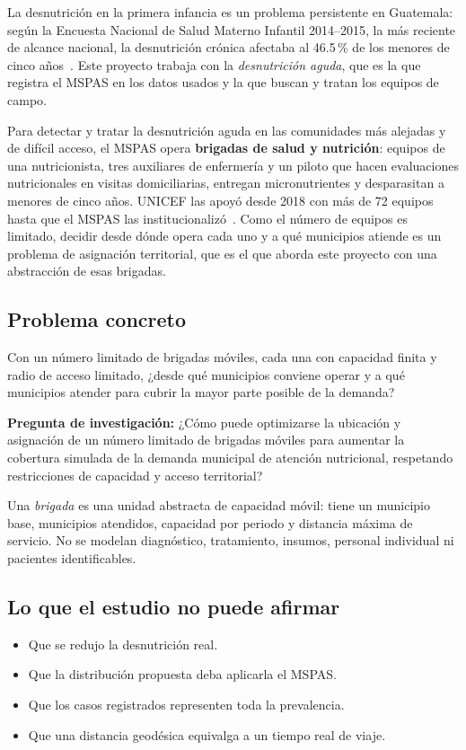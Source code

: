 \documentclass[11pt,letterpaper]{article}
\begin{document}
La desnutrición en la primera infancia es un problema persistente en Guatemala: según la Encuesta Nacional de Salud Materno Infantil 2014--2015, la más reciente de alcance nacional, la desnutrición crónica afectaba al 46.5\,\% de los menores de cinco años~\cite{ensmi}. Este proyecto trabaja con la \emph{desnutrición aguda}, que es la que registra el MSPAS en los datos usados y la que buscan y tratan los equipos de campo.

Para detectar y tratar la desnutrición aguda en las comunidades más alejadas y de difícil acceso, el MSPAS opera \textbf{brigadas de salud y nutrición}: equipos de una nutricionista, tres auxiliares de enfermería y un piloto que hacen evaluaciones nutricionales en visitas domiciliarias, entregan micronutrientes y desparasitan a menores de cinco años. UNICEF las apoyó desde 2018 con más de 72 equipos hasta que el MSPAS las institucionalizó~\cite{unicef2024}. Como el número de equipos es limitado, decidir desde dónde opera cada uno y a qué municipios atiende es un problema de asignación territorial, que es el que aborda este proyecto con una abstracción de esas brigadas.

\subsection{Problema concreto}

Con un número limitado de brigadas móviles, cada una con capacidad finita y radio de acceso limitado, ¿desde qué municipios conviene operar y a qué municipios atender para cubrir la mayor parte posible de la demanda?

\textbf{Pregunta de investigación:} ¿Cómo puede optimizarse la ubicación y asignación de un número limitado de brigadas móviles para aumentar la cobertura simulada de la demanda municipal de atención nutricional, respetando restricciones de capacidad y acceso territorial?

Una \emph{brigada} es una unidad abstracta de capacidad móvil: tiene un municipio base, municipios atendidos, capacidad por periodo y distancia máxima de servicio. No se modelan diagnóstico, tratamiento, insumos, personal individual ni pacientes identificables.

\subsection{Lo que el estudio no puede afirmar}

\begin{itemize}[nosep]
  \item Que se redujo la desnutrición real.
  \item Que la distribución propuesta deba aplicarla el MSPAS.
  \item Que los casos registrados representen toda la prevalencia.
  \item Que una distancia geodésica equivalga a un tiempo real de viaje.
\end{itemize}
\end{document}
